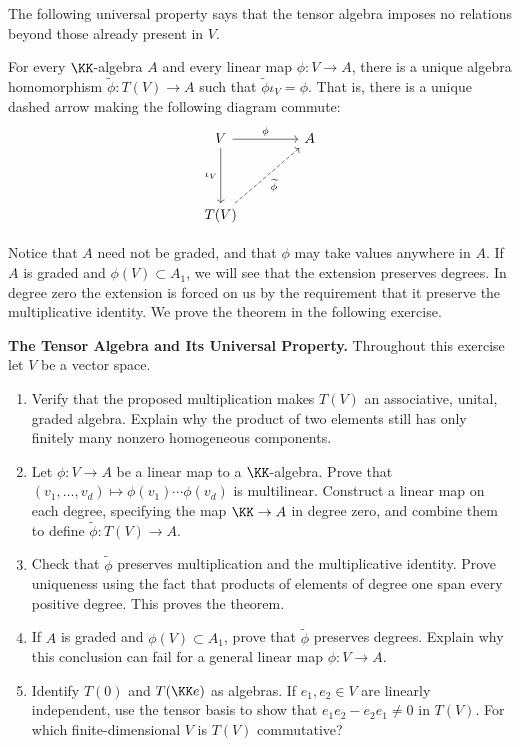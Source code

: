 \documentclass[12pt,reqno]{amsart}
\begin{document}
The following universal property says that the tensor algebra imposes no relations beyond those already present in $V$.

\begin{theorem}
For every $\KK$-algebra $A$ and every linear map $\phi:V\to A$, there is a unique algebra homomorphism $\widetilde\phi:T(V)\to A$ such that $\widetilde\phi\iota_V=\phi$. That is, there is a unique dashed arrow making the following diagram commute:
\[
\begin{tikzcd}[row sep=4em,column sep=4em]
V \arrow[r,"\phi"] \arrow[d,"\iota_V"'] & A \\
T(V) \arrow[ur,dashed,"\widetilde\phi"'] &
\end{tikzcd}
\]
\end{theorem}

Notice that $A$ need not be graded, and that $\phi$ may take values anywhere in $A$. If $A$ is graded and $\phi(V)\subset A_1$, we will see that the extension preserves degrees. In degree zero the extension is forced on us by the requirement that it preserve the multiplicative identity. We prove the theorem in the following exercise.

\hrulefill

\begin{problems}
\item\label{s:tensoralgebra} \textbf{The Tensor Algebra and Its Universal Property.} Throughout this exercise let $V$ be a vector space.
\begin{enumerate}
\item Verify that the proposed multiplication makes $T(V)$ an associative, unital, graded algebra. Explain why the product of two elements still has only finitely many nonzero homogeneous components.
\item Let $\phi:V\to A$ be a linear map to a $\KK$-algebra. Prove that $(v_1,\ldots,v_d)\mapsto\phi(v_1)\cdots\phi(v_d)$ is multilinear. Construct a linear map on each degree, specifying the map $\KK\to A$ in degree zero, and combine them to define $\widetilde\phi:T(V)\to A$.
\item Check that $\widetilde\phi$ preserves multiplication and the multiplicative identity. Prove uniqueness using the fact that products of elements of degree one span every positive degree. This proves the theorem.
\item If $A$ is graded and $\phi(V)\subset A_1$, prove that $\widetilde\phi$ preserves degrees. Explain why this conclusion can fail for a general linear map $\phi:V\to A$.
\item Identify $T(0)$ and $T(\KK e)$ as algebras. If $e_1,e_2\in V$ are linearly independent, use the tensor basis to show that $e_1e_2-e_2e_1\ne0$ in $T(V)$. For which finite-dimensional $V$ is $T(V)$ commutative?
\end{enumerate}
\end{problems}
\end{document}
